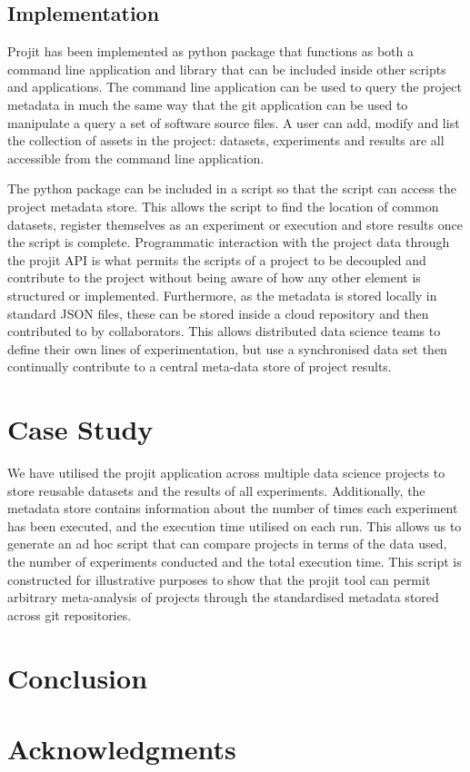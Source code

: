 \documentclass[sigconf]{acmart}
\begin{document}
\subsection{Implementation}

Projit has been implemented as python package that functions as both a command line 
application and library that can be included inside other scripts and applications. 
The command line application can be used to query the project metadata in much the 
same way that the git application can be used to manipulate a query a set of software
source files. A user can add, modify and list the collection of assets in the 
project: datasets, experiments and results are all accessible from the command line 
application.

The python package can be included in a script so that the script can access the 
project metadata store. This allows the script to find the location of common 
datasets, register themselves as an experiment or execution and store results once 
the script is complete. Programmatic interaction with the project data through
the projit API is what permits the scripts of a project to be decoupled and 
contribute to the project without being aware of how any other element is 
structured or implemented. Furthermore, as the metadata
is stored locally in standard JSON files, these can be stored inside a cloud 
repository and then contributed to by collaborators. 
This allows distributed data science teams to define their own lines of experimentation,
but use a synchronised data set then continually contribute to a central meta-data 
store of project results.

\section{Case Study}

We have utilised the projit application across multiple data science projects to store 
reusable datasets and the results of all experiments. Additionally, the metadata store 
contains information about the number of times each experiment has been executed, 
and the execution time utilised on each run. This allows us to generate an ad hoc 
script that can compare projects in terms of the data used, the number of experiments
conducted and the total execution time. This script is constructed for illustrative 
purposes to show that the projit tool can permit arbitrary meta-analysis of projects 
through the standardised metadata stored across git repositories.

\section{Conclusion}


\section{Acknowledgments}



\end{document}
